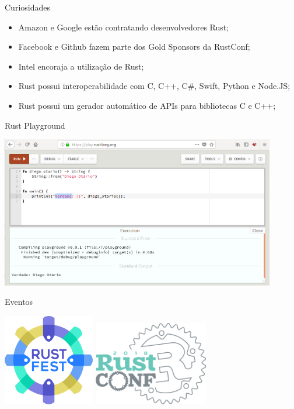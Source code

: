 \documentclass[aspectratio=169]{beamer}
\begin{document}
\begin{frame}{Curiosidades}
	\begin{itemize}
		\item Amazon e Google estão contratando desenvolvedores Rust;
		\item Facebook e Github fazem parte dos Gold Sponsors da RustConf;
		\item Intel encoraja a utilização de Rust;
		\item Rust possui interoperabilidade com C, C++, C\#, Swift, Python e Node.JS;
		\item Rust possui um gerador automático de APIs para bibliotecas C e C++;
	\end{itemize}
\end{frame}

\begin{frame}{Rust Playground}
	\begin{center}
		\includegraphics[width=12.0cm]{imgs/playground.png}	
	\end{center}
\end{frame}

\begin{frame}{Eventos}
	\begin{center}
		\includegraphics[width=4.0cm]{imgs/rustfest.png}
		\hspace{1cm}	
		\includegraphics[width=5.0cm]{imgs/rustconf.png}	
	\end{center}
\end{frame}
\end{document}
